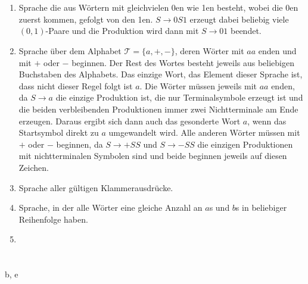 \documentclass[a4paper,10pt]{scrartcl}
\begin{document}
\section{}
\begin{enumerate}
 \item	Sprache die aus Wörtern mit gleichvielen 0en wie 1en besteht, wobei die
0en zuerst kommen, gefolgt von den 1en. 
	$S \to 0S1$ erzeugt dabei beliebig viele $(0,1)$-Paare und die
Produktion wird dann mit $S \to 01$ beendet.
 \item	Sprache über dem Alphabet $\mathcal{T} = \{a,
	+, -\}$, deren Wörter mit $aa$ enden und mit $+$ oder $-$
  beginnen.
	Der Rest des Wortes besteht jeweils aus beliebigen Buchstaben des
  Alphabets.
	Das einzige Wort, das Element dieser Sprache ist, dass nicht dieser
Regel folgt ist $a$.
	Die Wörter müssen jeweils mit $aa$ enden, da $S \to a$ die einzige
	Produktion ist, die nur Terminalsymbole erzeugt ist und die beiden
	verbleibenden Produktionen immer zwei Nichtterminale am Ende erzeugen.
	Daraus ergibt sich dann auch das gesonderte Wort $a$, wenn das
Startsymbol direkt zu $a$ umgewandelt wird. 
	Alle anderen Wörter müssen mit $+$ oder $-$ beginnen, da $S \to +SS$
und $S \to -SS$ die einzigen Produktionen mit nichtterminalen Symbolen sind
 und beide beginnen jeweils auf diesen Zeichen.
 \item	Sprache aller gültigen Klammerausdrücke.
 \item	Sprache, in der alle Wörter eine gleiche Anzahl an $a$s und $b$s in
beliebiger Reihenfolge haben.
 \item	
\end{enumerate}

\section{}
b, e
\end{document}
